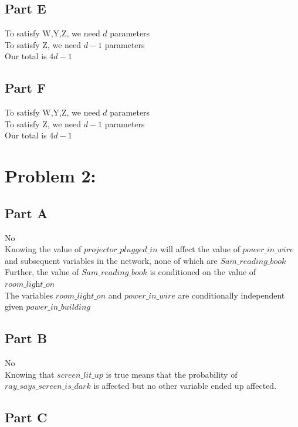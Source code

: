\documentclass[twoside,11pt]{article}
\theoremstyle{definition}
\begin{document}
\subsection*{Part E}

To satisfy W,Y,Z, we need $d$ parameters\\
To satisfy Z, we need $d-1$ parameters\\
Our total is $4d-1$ 

\subsection*{Part F}

To satisfy W,Y,Z, we need $d$ parameters\\
To satisfy Z, we need $d-1$ parameters\\
Our total is $4d-1$ 

\section*{Problem 2:}

\subsection*{Part A}
No\\
Knowing the value of $\textit{projector\_plugged\_in}$ will affect the value of $\textit{power\_in\_wire}$ and subsequent variables in the network, none of which are $\textit{Sam\_reading\_book}$\\
Further, the value of $\textit{Sam\_reading\_book}$ is conditioned on the value of $\textit{room\_light\_on}$\\
The variables $\textit{room\_light\_on}$ and $\textit{power\_in\_wire}$ are conditionally independent given $\textit{power\_in\_building}$

\subsection*{Part B}

No\\
Knowing that $\textit{screen\_lit\_up}$ is true means that the probability of $\textit{ray\_says\_screen\_is\_dark}$ is affected but no other variable ended up affected.

\subsection*{Part C}
\end{document}
